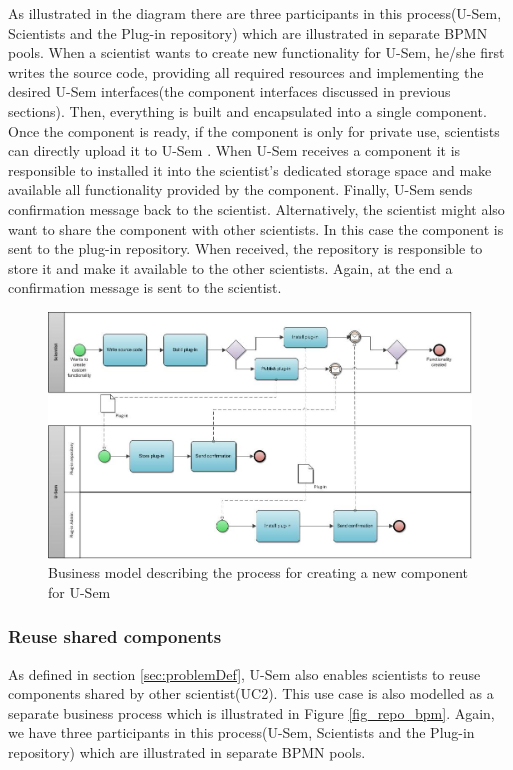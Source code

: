 As illustrated in the diagram there are three participants in this process(U-Sem, Scientists and the Plug-in repository) which are illustrated in separate BPMN pools. When a scientist wants to create new functionality for U-Sem, he/she first writes the source code, providing all required resources and implementing the desired U-Sem interfaces(the component interfaces discussed in previous sections). Then, everything is built and encapsulated into a single component. Once the component is ready, if the component is only for private use, scientists can directly upload it to U-Sem . When U-Sem receives a component it is responsible to installed it into the scientist's dedicated storage space and make available all functionality provided by the component. Finally, U-Sem sends confirmation message back to the scientist. Alternatively, the scientist might also want to share the component with other scientists. In this case the component is sent to the plug-in repository. When received, the repository is responsible to store it and make it available to the other scientists. Again, at the end a confirmation message is sent to the scientist.

\begin{figure}[h!]
  \centering
  	\includegraphics[scale=0.7,angle=90]{plug-in/business_processes/CreatePlugInBusinessModel.jpg}
  \caption{Business model describing the process for creating a new component for U-Sem}
  \label{fig_install_bpm}
\end{figure}

\subsubsection{Reuse shared components}

As defined in section \ref{sec:problemDef}, U-Sem also enables scientists to reuse components shared by other scientist(UC2). This use case is also modelled as a separate business process which is illustrated in Figure \ref{fig_repo_bpm}. Again, we have three participants in this process(U-Sem, Scientists and the Plug-in repository) which are illustrated in separate BPMN pools. 

